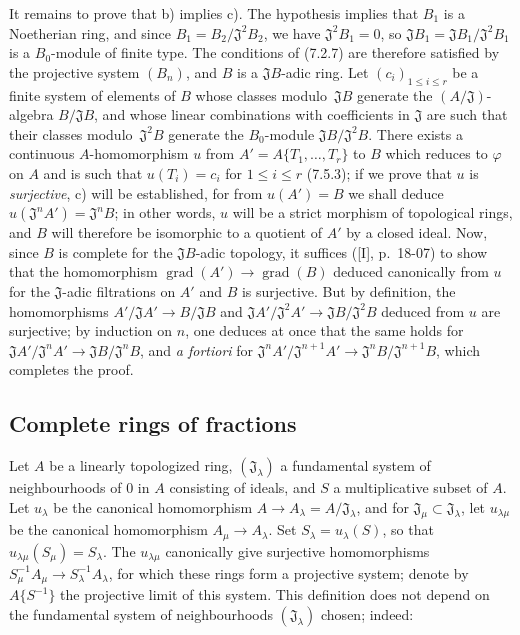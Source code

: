 It remains to prove that b) implies c). The hypothesis implies that $B_1$ is a
Noetherian ring, and since $B_1=B_2/\mathfrak J^2B_2$, we have
$\mathfrak J^2B_1=0$, so
$\mathfrak JB_1=\mathfrak JB_1/\mathfrak J^2B_1$ is a $B_0$-module of finite
type. The conditions of (7.2.7) are therefore satisfied by the projective system
$(B_n)$, and $B$ is a $\mathfrak JB$-adic ring. Let
$(c_i)_{1\leq i\leq r}$ be a finite system of elements of $B$ whose classes
modulo~$\mathfrak JB$ generate the $(A/\mathfrak J)$-algebra
$B/\mathfrak JB$, and whose linear combinations with coefficients in
$\mathfrak J$ are such that their classes modulo~$\mathfrak J^2B$ generate
the $B_0$-module $\mathfrak JB/\mathfrak J^2B$. There exists a continuous
$A$-homomorphism $u$ from $A'=A\{T_1,\ldots,T_r\}$ to $B$ which
reduces to $\varphi$ on $A$ and is such that $u(T_i)=c_i$ for $1\leq i\leq r$
(7.5.3); if we prove that $u$ is \emph{surjective}, c) will be established, for from
$u(A')=B$ we shall deduce $u(\mathfrak J^nA')=\mathfrak J^nB$; in other words, $u$
will be a strict morphism of topological rings, and $B$ will therefore be isomorphic to a
quotient of $A'$ by a closed ideal. Now, since $B$ is complete for the
$\mathfrak JB$-adic topology, it suffices ([I], p.~18-07) to show that
the homomorphism $\operatorname{grad}(A')\to\operatorname{grad}(B)$ deduced
canonically from $u$ for the $\mathfrak J$-adic filtrations on $A'$ and
$B$ is surjective. But by definition, the homomorphisms
$A'/\mathfrak JA'\to B/\mathfrak JB$ and
$\mathfrak JA'/\mathfrak J^2A'\to\mathfrak JB/\mathfrak J^2B$ deduced from $u$
are surjective; by induction on $n$, one deduces at once that the same holds for
$\mathfrak JA'/\mathfrak J^nA'\to\mathfrak JB/\mathfrak J^nB$, and
\emph{a fortiori} for
$\mathfrak J^nA'/\mathfrak J^{n+1}A'\to
\mathfrak J^nB/\mathfrak J^{n+1}B$, which completes the proof.

\subsection{Complete rings of fractions}
\label{subsection:0.7.6}

\begin{env}[7.6.1]
\label{0.7.6.1}
Let $A$ be a linearly topologized ring, $(\mathfrak J_\lambda)$ a
fundamental system of neighbourhoods of 0 in $A$ consisting of ideals, and $S$ a
multiplicative subset of $A$. Let $u_\lambda$ be the canonical homomorphism
$A\to A_\lambda=A/\mathfrak J_\lambda$, and for
$\mathfrak J_\mu\subset\mathfrak J_\lambda$, let $u_{\lambda\mu}$ be
the canonical homomorphism $A_\mu\to A_\lambda$. Set
$S_\lambda=u_\lambda(S)$, so that
$u_{\lambda\mu}(S_\mu)=S_\lambda$. The $u_{\lambda\mu}$ canonically give
surjective homomorphisms
$S_\mu^{-1}A_\mu\to S_\lambda^{-1}A_\lambda$, for which these rings
form a projective system; denote by $A\{S^{-1}\}$ the projective
limit of this system. This definition does not depend on the fundamental system
of neighbourhoods $(\mathfrak J_\lambda)$ chosen; indeed:
\end{env}

